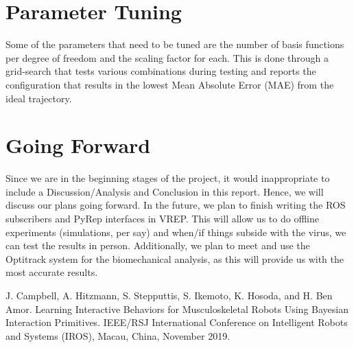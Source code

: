 \documentclass[letterpaper, 10 pt, conference]{ieeeconf}  %
\begin{document}
\section{Parameter Tuning}
Some of the parameters that need to be tuned are the number of basis functions per degree of freedom and the scaling factor for each. This is done through a grid-search that tests various combinations during testing and reports the configuration that results in the lowest Mean Absolute Error (MAE) from the ideal trajectory.

\section{Going Forward}
Since we are in the beginning stages of the project, it would inappropriate to include a Discussion/Analysis and Conclusion in this report. Hence, we will discuss our plans going forward. In the future, we plan to finish writing the ROS subscribers and PyRep interfaces in VREP. This will allow us to do offline experiments (simulations, per say) and when/if things subside with the virus, we can test the results in person. Additionally, we plan to meet and use the Optitrack system for the biomechanical analysis, as this will provide us with the most accurate results.

\addtolength{\textheight}{-12cm}   %








\begin{thebibliography}{99}
 J. Campbell, A. Hitzmann, S. Stepputtis, S. Ikemoto, K. Hosoda, and H. Ben Amor. Learning Interactive Behaviors for Musculoskeletal Robots Using Bayesian Interaction Primitives. IEEE/RSJ International Conference on Intelligent Robots and Systems (IROS), Macau, China, November 2019.
\end{thebibliography}
\end{document}
